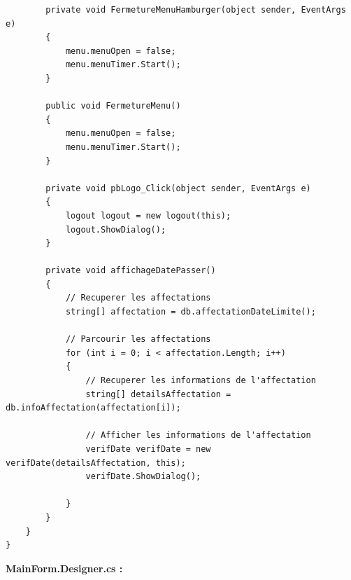 \documentclass[main.tex]{subfiles}
\begin{document}
\begin{lstlisting}
        private void FermetureMenuHamburger(object sender, EventArgs e)
        {
            menu.menuOpen = false;
            menu.menuTimer.Start();
        }

        public void FermetureMenu()
        {
            menu.menuOpen = false;
            menu.menuTimer.Start();
        }

        private void pbLogo_Click(object sender, EventArgs e)
        {
            logout logout = new logout(this);
            logout.ShowDialog();
        }

        private void affichageDatePasser()
        {
            // Recuperer les affectations
            string[] affectation = db.affectationDateLimite();

            // Parcourir les affectations
            for (int i = 0; i < affectation.Length; i++)
            {
                // Recuperer les informations de l'affectation
                string[] detailsAffectation = db.infoAffectation(affectation[i]);

                // Afficher les informations de l'affectation
                verifDate verifDate = new verifDate(detailsAffectation, this);
                verifDate.ShowDialog();

            }
        }
    }
}
\end{lstlisting}

\textbf{MainForm.Designer.cs :}
\end{document}
